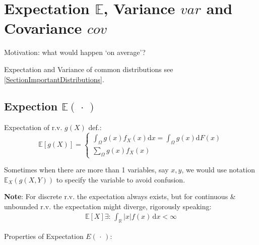 \section{Expectation $\mathbb{E}$, Variance $var$ and Covariance $cov$}
Motivation: what would happen `on average'?

Expectation and Variance of common distributions see \autoref{SectionImportantDistributions}.

\subsection{Expection $ \mathbb{E}(\,\cdot\,) $}
    Expectation of r.v. $g(X)$ def.:
    \begin{equation}
    \mathbb{E} [g(X)]=\begin{cases}
        {\displaystyle\int_\Omega g(x) f_X(x)\mathrm{d}x=\int_\Omega g(x)\mathrm{d}F(x)}\\
        {\displaystyle\sum_{\Omega}g(x)f_X(x)}
    \end{cases}
\end{equation}

    Sometimes when there are more than 1 variables, say $ x,y $, we would use notation $ \mathbb{E}_X\left( g(X,Y) \right)  $ to specify the variable to avoid confusion.

    \textbf{Note}: For discrete r.v. the expectation always exists, but for continuous \& unbounded r.v. the expectation might diverge, rigorously speaking:
    \begin{align}
        \mathbb{E}\left[ X \right]\exists:\, \int_{\mathbb{R}}|x|f(x)\,\mathrm{d}x<\infty  
    \end{align}
    
    
 
\begin{point}
    Properties of Expectation $E(\,\cdot\,)$:
\end{point}

